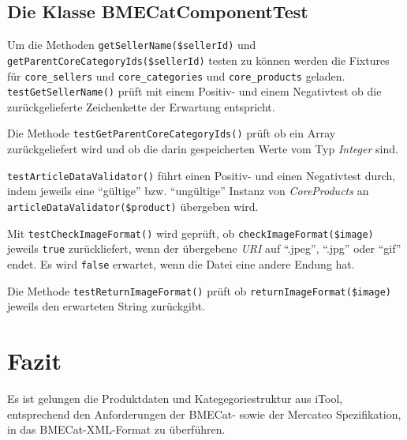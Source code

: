 	\subsection{Die Klasse BMECatComponentTest}
	
	Um die Methoden \texttt{getSellerName(\$sellerId)} und \texttt{getParentCoreCategoryIds(\$sellerId)} testen zu können werden die Fixtures für \texttt{core\_sellers} und \texttt{core\_categories} und \texttt{core\_products} geladen.
	\texttt{testGetSellerName()} prüft mit einem Positiv- und einem Negativtest ob die zurückgelieferte Zeichenkette der Erwartung entspricht.
	
	Die Methode \texttt{testGetParentCoreCategoryIds()} prüft ob ein Array zurückgeliefert wird und ob die darin gespeicherten Werte vom Typ \textit{Integer} sind.
	
	\texttt{testArticleDataValidator()} führt einen Positiv- und einen Negativtest durch, indem jeweils eine \enquote{gültige} bzw. \enquote{ungültige} Instanz von \textit{CoreProducts} an \texttt{articleDataValidator(\$product)} übergeben wird.
	
	Mit \texttt{testCheckImageFormat()} wird geprüft, ob \texttt{checkImageFormat(\$image)} jeweils \texttt{true} zurückliefert, wenn der übergebene \textit{URI} auf \enquote{.jpeg}, \enquote{.jpg} oder \enquote{gif} endet. Es wird \texttt{false} erwartet, wenn die Datei eine andere Endung hat.
	
	Die Methode \texttt{testReturnImageFormat()} prüft ob \texttt{returnImageFormat(\$image)} jeweils den erwarteten String zurückgibt.
	
	\section{Fazit}
	
	Es ist gelungen die Produktdaten und Kategegoriestruktur aus iTool, entsprechend den Anforderungen der BMECat- sowie der Mercateo Spezifikation, in das BMECat-XML-Format zu überführen. 
	
